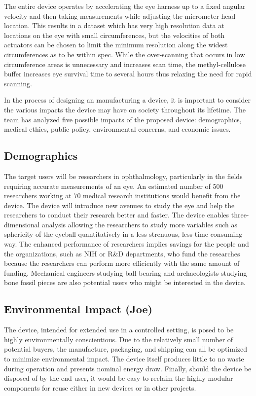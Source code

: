 \documentclass{article}
\begin{document}
The entire device operates by accelerating the eye harness up to a fixed angular velocity and then taking measurements while adjusting the micrometer head location. This results in a dataset which has very high resolution data at locations on the eye with small circumferences, but the velocities of both actuators can be chosen to limit the minimum resolution along the widest circumferences as to be within spec. While the over-scanning that occurs in low circumference areas is unnecessary and increases scan time, the methyl-cellulose buffer increases eye survival time to several hours thus relaxing the need for rapid scanning.

In the process of designing an manufacturing a device, it is important to consider the various impacts the device may have on society throughout its lifetime. The team has analyzed five possible impacts of the proposed device: demographics, medical ethics, public policy, environmental concerns, and economic issues. 


\subsection{Demographics}
\label{sec:Demographics}

The target users will be researchers in ophthalmology,
particularly in the fields requiring accurate measurements of an
eye. An estimated number of 500 researchers working at 70 medical research institutions would
benefit from the device. The device will introduce new avenues to
study the eye and help the researchers to conduct their research
better and faster. The device enables three-dimensional analysis
allowing the researchers to study more variables such as sphericity of
the eyeball quantitatively in a less strenuous, less time-consuming
way. The enhanced performance of researchers implies savings for the
people and the organizations, such as NIH or R\&D departments, who
fund the researches because the researchers can perform more
efficiently with the same amount of funding. Mechanical engineers
studying ball bearing and archaeologists studying bone fossil pieces
are also potential users who might be interested in the device.
\subsection{Environmental Impact (Joe)}
\label{sec:environment}

The device, intended for extended use in a controlled setting, is
posed to be highly environmentally conscientious. Due to the
relatively small number of potential buyers, the manufacture,
packaging, and shipping can all be optimized to minimize environmental
impact. The device itself produces little to no waste during operation
and presents nominal energy draw. Finally, should the device be
disposed of by the end user, it would be easy to reclaim the
highly-modular components for reuse either in new devices or in other
projects.
\end{document}
